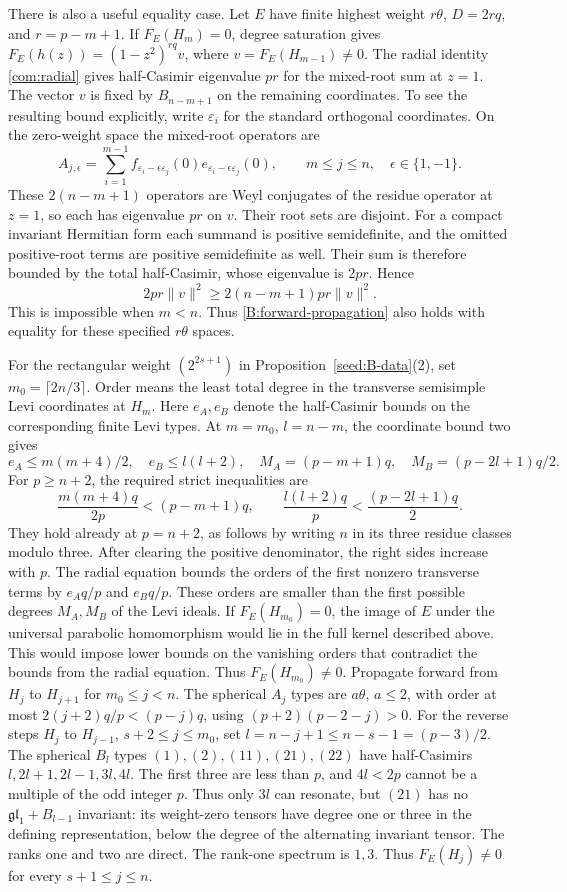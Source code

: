 \documentclass[11pt,a4paper]{amsart}
\numberwithin{equation}{section}
\theoremstyle{definition}
\theoremstyle{remark}
\newcommand{\glg}{\mathfrak{gl}}
\begin{document}
There is also a useful equality case. Let $E$ have finite highest
weight $r\theta$, $D=2rq$, and $r=p-m+1$. If $F_E(H_m)=0$, degree
saturation gives $F_E(h(z))=(1-z^2)^{rq}v$, where
$v=F_E(H_{m-1})\ne0$. The radial identity \cref{com:radial} gives
half-Casimir eigenvalue $pr$ for the mixed-root sum at $z=1$.
The vector $v$ is fixed by $B_{n-m+1}$ on the remaining coordinates.
To see the resulting bound explicitly, write $\varepsilon_i$ for the
standard orthogonal coordinates. On the zero-weight space the mixed-root
operators are
$$
 A_{j,\epsilon}=\sum_{i=1}^{m-1}
 f_{\varepsilon_i-\epsilon\varepsilon_j}(0)
 e_{\varepsilon_i-\epsilon\varepsilon_j}(0),
 \qquad m\le j\le n,\quad \epsilon\in\{1,-1\}.
$$
These $2(n-m+1)$ operators are Weyl conjugates of the residue operator
at $z=1$, so each
has eigenvalue $pr$ on $v$. Their root sets are disjoint. For a compact
invariant Hermitian form each summand is positive semidefinite, and
the omitted positive-root terms are positive semidefinite as well.
Their sum is therefore bounded by the total half-Casimir, whose
eigenvalue is $2pr$. Hence
$$
 2pr\|v\|^2\ge2(n-m+1)pr\|v\|^2.
$$
This is impossible when $m<n$. Thus
\eqref{B:forward-propagation} also holds with equality for these
specified $r\theta$ spaces.

For the rectangular weight $(2^{2s+1})$ in
Proposition~\ref{seed:B-data}(2), set $m_0=\lceil2n/3\rceil$.
Order means the least total degree in the transverse semisimple
Levi coordinates at $H_m$. Here $e_A,e_B$ denote the half-Casimir
bounds on the corresponding finite Levi types. At $m=m_0$, $l=n-m$,
the coordinate bound two gives
$$
 e_A\le m(m+4)/2,\quad e_B\le l(l+2),\quad
 M_A=(p-m+1)q,\quad M_B=(p-2l+1)q/2.
$$
For $p\ge n+2$, the required strict inequalities are
$$
 \frac{m(m+4)q}{2p}<(p-m+1)q,
 \qquad
 \frac{l(l+2)q}{p}<\frac{(p-2l+1)q}{2}.
$$
They hold already at $p=n+2$, as follows by writing $n$ in its three
residue classes modulo three. After clearing the positive denominator,
the right sides increase with $p$. The radial equation bounds the
orders of the first nonzero transverse terms by $e_Aq/p$ and $e_Bq/p$.
These orders are smaller than the first possible degrees $M_A,M_B$
of the Levi ideals. If $F_E(H_{m_0})=0$, the image of $E$ under the universal
parabolic homomorphism would lie in the full kernel described
above. This would impose lower bounds on the vanishing orders
that contradict the bounds from the radial equation. 
Thus $F_E(H_{m_0})\ne0$.
Propagate forward from $H_j$ to $H_{j+1}$ for $m_0\le j<n$.
The spherical $A_j$ types are $a\theta$, $a\le2$, with order
at most $2(j+2)q/p<(p-j)q$, using $(p+2)(p-2-j)>0$.
For the reverse steps $H_j$ to $H_{j-1}$, $s+2\le j\le m_0$,
set $l=n-j+1\le n-s-1=(p-3)/2$.
The spherical $B_l$ types $(1),(2),(11),(21),(22)$ have half-Casimirs
$l,2l+1,2l-1,3l,4l$.
The first three are less than $p$, and $4l<2p$ cannot be a
multiple of the odd integer $p$. Thus only $3l$ can resonate,
but $(21)$ has no $\glg_1+B_{l-1}$ invariant:
its weight-zero tensors have degree one or three in the defining
representation, below the degree of the alternating invariant tensor. The ranks one and two are direct. The rank-one spectrum is
$1,3$. Thus $F_E(H_j)\ne0$ for every $s+1\le j\le n$.
\end{document}
